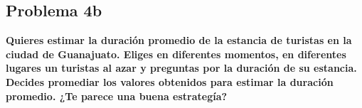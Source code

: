 \subsection*{Problema 4b}
\textbf{Quieres estimar la duración promedio de la estancia de turistas en la ciudad de Guanajuato. Eliges en diferentes momentos, en diferentes lugares un turistas al azar y preguntas por la duración de su estancia. Decides promediar los valores obtenidos para estimar la duración promedio. ¿Te parece una buena estrategía?}